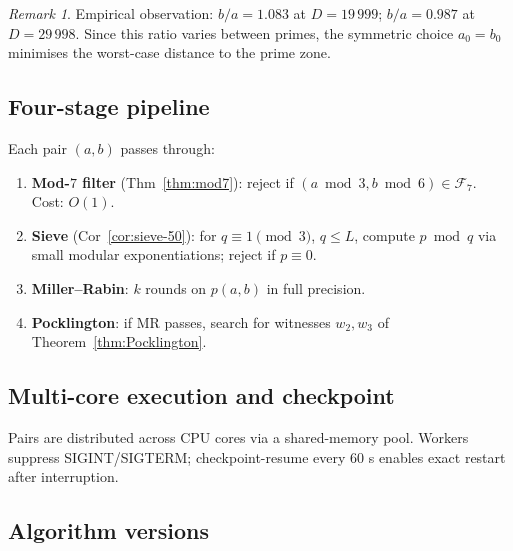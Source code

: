 \documentclass[11pt,a4paper]{article}
\theoremstyle{definition}
\theoremstyle{remark}
\newtheorem{remark}[theorem]{Remark}
\newcommand{\F}{\mathcal{F}}
\begin{document}
\begin{remark}
Empirical observation: $b/a = 1.083$ at $D=19\,999$; $b/a = 0.987$ at
$D=29\,998$. Since this ratio varies between primes, the symmetric choice
$a_0=b_0$ minimises the worst-case distance to the prime zone.
\end{remark}

\subsection{Four-stage pipeline}

Each pair $(a,b)$ passes through:
\begin{enumerate}
\item \textbf{Mod-$7$ filter} (Thm~\ref{thm:mod7}): reject if
  $(a\bmod 3,b\bmod 6)\in\F_7$. Cost: $O(1)$.
\item \textbf{Sieve} (Cor~\ref{cor:sieve-50}): for $q\equiv 1\pmod{3}$,
  $q\leq L$, compute $p\bmod q$ via small modular exponentiations; reject
  if $p\equiv 0$.
\item \textbf{Miller--Rabin}: $k$ rounds on $p(a,b)$ in full precision.
\item \textbf{Pocklington}: if MR passes, search for witnesses
  $w_2,w_3$ of Theorem~\ref{thm:Pocklington}.
\end{enumerate}

\subsection{Multi-core execution and checkpoint}

Pairs are distributed across CPU cores via a shared-memory pool. Workers
suppress SIGINT/SIGTERM; checkpoint-resume every $60$ s enables exact
restart after interruption.

\subsection{Algorithm versions}
\end{document}
